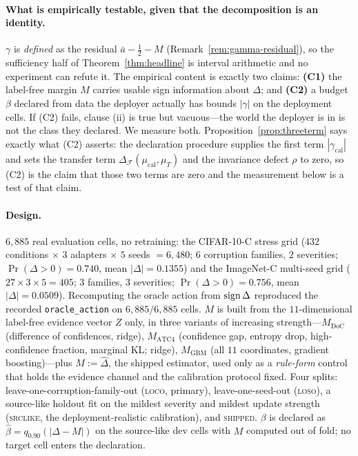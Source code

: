 \paragraph{What is empirically testable, given that the decomposition is an identity.}
$\gamma$ is \emph{defined} as the residual $\bar a-\tfrac12-M$ (Remark~\ref{rem:gamma-residual}), so
the sufficiency half of Theorem~\ref{thm:headline} is interval arithmetic and no experiment can
refute it. The empirical content is exactly two claims:
\textbf{(C1)} the label-free margin $M$ carries usable sign information about $\Delta$; and
\textbf{(C2)} a budget $\beta$ declared from data the deployer actually has bounds $|\gamma|$ on the
deployment cells. If (C2) fails, clause (ii) is true but vacuous---the world the deployer is in is
not the class they declared. We measure both. Proposition~\ref{prop:threeterm} says exactly what
(C2) asserts: the declaration procedure supplies the first term $|\gamma_{\mathrm{cal}}|$ and sets
the transfer term $\Delta_{\mathcal F}(\mu_{\mathrm{cal}},\mu_T)$ and the invariance defect $\rho$
to zero, so (C2) is the claim that those two terms are zero and the measurement below is a test of
that claim.

\paragraph{Design.} $6{,}885$ real evaluation cells, no retraining: the CIFAR-10-C stress grid
($432$ conditions $\times$ $3$ adapters $\times$ $5$ seeds $=6{,}480$; $6$ corruption families, $2$
severities; $\Pr(\Delta>0)=0.740$, mean $|\Delta|=0.1355$) and the ImageNet-C multi-seed grid
($27\times3\times5=405$; $3$ families, $3$ severities; $\Pr(\Delta>0)=0.756$, mean
$|\Delta|=0.0509$). Recomputing the oracle action from $\operatorname{sign}\Delta$ reproduced the recorded
\texttt{oracle\_action} on $6{,}885/6{,}885$ cells.
$M$ is built from the $11$-dimensional label-free evidence vector $Z$ only, in three variants of
increasing strength---$M_{\mathrm{DoC}}$ (difference of confidences, ridge), $M_{\mathrm{ATC4}}$
(confidence gap, entropy drop, high-confidence fraction, marginal KL; ridge), $M_{\mathrm{GBM}}$
(all $11$ coordinates, gradient boosting)---plus $M:=\widehat\Delta$, the shipped estimator, used
only as a \emph{rule-form} control that holds the evidence channel and the calibration protocol
fixed. Four splits: leave-one-corruption-family-out (\textsc{loco}, primary), leave-one-seed-out
(\textsc{loso}), a source-like holdout fit on the mildest severity and mildest update strength
(\textsc{srclike}, the deployment-realistic calibration), and \textsc{shipped}. $\beta$ is declared
as $\widehat\beta=q_{0.90}(|\Delta-M|)$ on the source-like dev cells with $M$ computed out of fold;
no target cell enters the declaration.

